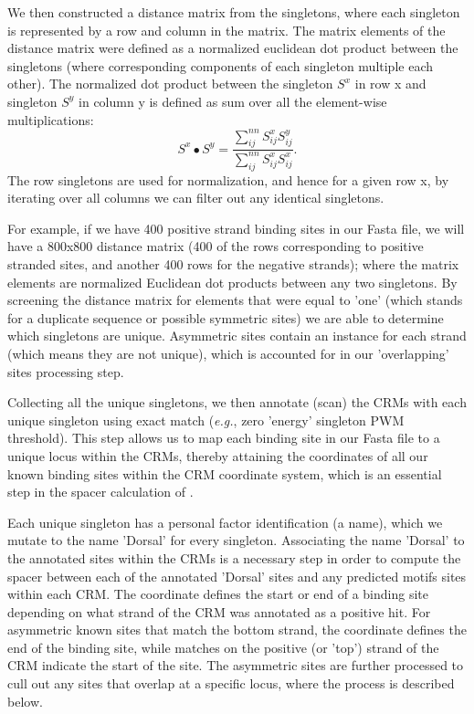 	 We then constructed a distance matrix from the singletons, where each singleton is represented by a row and column in the matrix.   The matrix elements of the distance matrix were defined as a normalized euclidean dot product between the singletons (where corresponding components of each singleton multiple each other).  The normalized dot product between the singleton $S^x$ in row x and singleton $S^y$ in column y is defined as sum over all the element-wise multiplications:
\begin{equation}
	S^x \bullet S^y   = \frac{\sum_{ij}^{nn} S_{ij}^xS_{ij}^y}{\sum_{ij}^{nn}S_{ij}^xS_{ij}^x}.
	 \end{equation}	 
	 The row singletons are used for normalization, and hence for a given row x, by iterating over all columns we can filter out any identical singletons.
	 
For example, if we have 400 positive strand binding sites in our Fasta file, we will have a 800x800 distance matrix (400 of the rows corresponding to positive stranded sites, and another 400 rows for the negative strands); where the matrix elements are normalized Euclidean dot products between any two singletons.  By screening the distance matrix for elements that were equal to 'one' (which stands for a duplicate sequence or possible symmetric sites) we are able to determine which singletons are unique.  Asymmetric sites contain an instance for each strand (which means they are not unique), which is accounted for in our 'overlapping' sites processing step.  
	 
Collecting all the unique singletons, we then annotate (scan) the CRMs with each unique singleton using exact match (\textit{e.g.}, zero 'energy' singleton PWM threshold).  This step allows us to map each binding site in our Fasta file to a unique locus within the CRMs, thereby attaining the coordinates of all our known binding sites within the CRM coordinate system, which is an essential step in the spacer calculation of .  
	 
Each unique singleton has a personal factor identification (a name), which we mutate to the name 'Dorsal' for every singleton.  Associating the name 'Dorsal' to the annotated sites within the CRMs is a necessary step in order to compute the spacer between each of the annotated 'Dorsal' sites and any predicted motifs sites within each CRM.  The coordinate defines the start or end of a binding site depending on what strand of the CRM was annotated as a positive hit.  For asymmetric known sites that match the bottom strand, the coordinate defines the end of the binding site, while matches on the positive (or 'top') strand of the CRM indicate the start of the site.  The asymmetric sites are further processed to cull out any sites that overlap at a specific locus, where the process is described below.    

